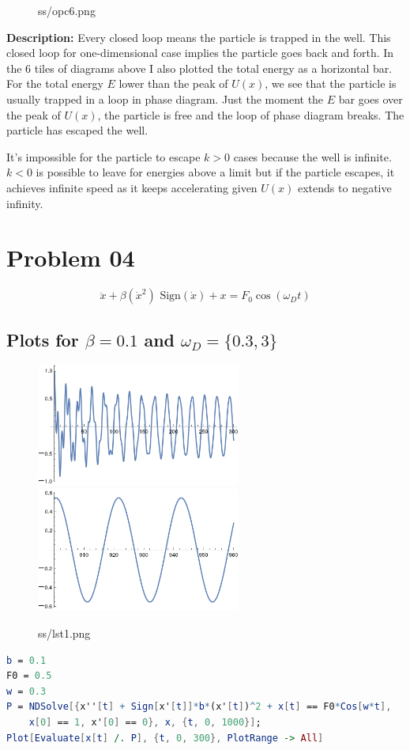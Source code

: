 \documentclass[12pt,letter]{article}
\begin{document}
{\begin{figure}[H]
	\caption{ss/opc6.png}
	\label{fig:ss-opc6-png-}
\end{figure}
\textbf{Description:} Every closed loop means the particle is trapped in the well. This closed loop for one-dimensional case implies the particle goes back and forth. In the 6 tiles of diagrams above I also plotted the total energy as a horizontal bar. For the total energy $E$ lower than the peak of $U(x)$, we see that the particle is usually trapped in a loop in phase diagram. Just the moment the $E$ bar goes over the peak of $U(x)$, the particle is free and the loop of phase diagram breaks. The particle has escaped the well. 

It's impossible for the particle to escape $k>0$ cases because the well is infinite. $k<0$ is possible to leave for energies above a limit but if the particle escapes, it achieves infinite speed as it keeps accelerating given $U(x)$ extends to negative infinity. 
\newpage
\section*{Problem 04} 
\[
\ddot{x} + \beta(\dot{x}^2) \text{ Sign}(\dot{x})  + x = F_0 \cos(\omega_D t)
\]

\subsection*{Plots for $\beta = 0.1$ and $\omega_D = \{0.3, 3\} $}
\begin{tcolorbox}
	\begin{figure}[H]
		\centering
		\includegraphics[width=0.6\textwidth]{ss/lst03.png}
		\includegraphics[width=0.6\textwidth]{ss/honky2.png}
		\caption{ss/lst1.png}
		\label{fig:ss-lst1-png}
	\end{figure}
\begin{lstlisting}[language=Mathematica]
b = 0.1
F0 = 0.5
w = 0.3
P = NDSolve[{x''[t] + Sign[x'[t]]*b*(x'[t])^2 + x[t] == F0*Cos[w*t], 
    x[0] == 1, x'[0] == 0}, x, {t, 0, 1000}];
Plot[Evaluate[x[t] /. P], {t, 0, 300}, PlotRange -> All]\end{lstlisting}
\end{tcolorbox}

}
\end{document}
